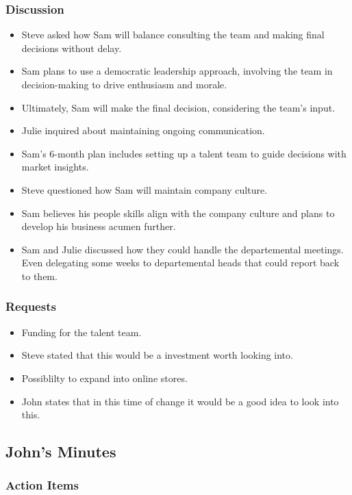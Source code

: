 \documentclass[a4paper,10pt]{article}
\begin{document}
\subsubsection{Discussion}
\begin{itemize}
    \item Steve asked how Sam will balance consulting the team and making final decisions without delay.
    \item Sam plans to use a democratic leadership approach, involving the team in decision-making to drive enthusiasm and morale.
    \item Ultimately, Sam will make the final decision, considering the team's input.
    \item Julie inquired about maintaining ongoing communication.
    \item Sam's 6-month plan includes setting up a talent team to guide decisions with market insights.
    \item Steve questioned how Sam will maintain company culture.
    \item Sam believes his people skills align with the company culture and plans to develop his business acumen further.
    \item Sam and Julie discussed how they could handle the departemental meetings. Even delegating some weeks to departemental heads that could report back to them.
\end{itemize}

\subsubsection{Requests}
\begin{itemize}
    \item Funding for the talent team.
    \item Steve stated that this would be a investment worth looking into.
    \item Possiblilty to expand into online stores.
    \item John states that in this time of change it would be a good idea to look into this.
\end{itemize}

\subsection{John's Minutes}
\author{Graham Pellegrini (Sam)}

\subsubsection{Action Items}
\end{document}
